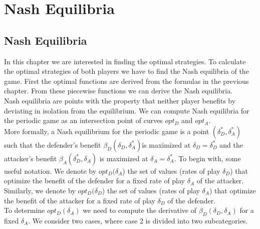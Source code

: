 \chapter{Nash Equilibria}
\label{chapter:Nash}
%


\section{Nash Equilibria}

In this chapter we are interested in finding the optimal strategies. To calculate the optimal strategies of both players we have to find the Nash equilibria of the game. First the optimal functions are derived from the formulas in the previous chapter. From these piecewise functions we can derive the Nash equilibria. \\

Nash equilibria are points with the property that neither player benefits by deviating in isolation from the equilibrium. We can compute Nash equilibria for the periodic game as an intersection point of curves $opt_{D}$ and $opt_{A}$. 
\\
More formally, a Nash equilibrium for the periodic game is a point $(\delta_{D}^{*},\delta_{A}^{*})$ such that
the defender's benefit $\beta_{D}(\delta_{D},\delta_{A}^{*}) $is maximized at $\delta_{D}= \delta_{D}^{*}$ and the attacker's benefit
$\beta_{A}(\delta_{D}^{*},\delta_{A}) $ is maximized at $\delta_{A}= \delta_{A}^{*}$.
To begin with, some useful notation. We denote by $opt_{D}(\delta_{A}$) the set of values (rates
of play $\delta_{D}$) that optimize the benefit of the defender for a fixed rate of play $\delta_{A}$ of the
attacker. Similarly, we denote by $opt_{D}(\delta_{D}$) the set of values (rates of play $\delta_{A}$) that optimize
the benefit of the attacker for a fixed rate of play $\delta_{D}$ of the defender. \\

To determine $opt_{D}(\delta_{A})$ we need to compute the derivative of  $\beta_{D}(\delta_{D},\delta_{A}) $ for a fixed $\delta_{A}$.
 We consider two cases, where case 2 is divided into two subcategories. 

